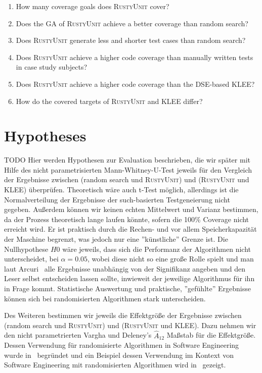 \documentclass[paper=a4,%
  twoside,%
  BCOR4mm,%
  abstract=true,%
  toc=bibliography,%
  chapterprefix=true,%
  toc=bibliographynumbered,%
  open=right,%
  english,%
  pagesize=pdftex]{scrreprt}
\begin{document}
\begin{enumerate}[start=1, label={\bfseries RQ\arabic*:}]
    \item How many coverage goals does \textsc{RustyUnit} cover?
    \item Does the \ac{GA} of \textsc{RustyUnit} achieve a better coverage than random search?
    \item Does \textsc{RustyUnit} generate less and shorter test cases than random search?
    \item Does \textsc{RustyUnit} achieve a higher code coverage than manually written tests in case study subjects?
    \item Does \textsc{RustyUnit} achieve a higher code coverage than the \ac{DSE}-based \textsc{KLEE}?
    \item How do the covered targets of \textsc{RustyUnit} and \textsc{KLEE} differ?
\end{enumerate} 


\section{Hypotheses}
\label{sec:hypotheses}
TODO Hier werden Hypothesen zur Evaluation beschrieben, die wir später mit Hilfe des nicht parametrisierten Mann-Whitney-U-Test jeweils für den Vergleich der Ergebnisse zwischen (random search und \textsc{RustyUnit}) und (\textsc{RustyUnit} und \textsc{KLEE}) überprüfen. Theoretisch wäre auch t-Test möglich, allerdings ist die Normalverteilung der Ergebnisse der such-basierten Testgeneierung nicht gegeben. Außerdem können wir keinen echten Mittelwert und Varianz bestimmen, da der Prozess theoretisch lange laufen könnte, sofern die 100\% Coverage nicht erreicht wird. Er ist praktisch durch die Rechen- und vor allem Speicherkapazität der Maschine begrenzt, was jedoch nur eine ''künstliche'' Grenze ist. Die Nullhypothese $H0$ wäre jeweils, dass sich die Performanz der Algorithmen nicht unterscheidet, bei $\alpha = 0.05$, wobei diese nicht so eine große Rolle spielt und man laut Arcuri~\cite{Arcuri2011} alle Ergebnisse unabhängig von der Signifikanz angeben und den Leser selbst entscheiden lassen sollte, inwieweit der jeweilige Algorithmus für ihn in Frage kommt. Statistische Auswertung und praktische, ''gefühlte'' Ergebnisse können sich bei randomisierten Algorithmen stark unterscheiden. 

Des Weiteren bestimmen wir jeweils die Effektgröße der Ergebnisse zwischen (random search und \textsc{RustyUnit}) und (\textsc{RustyUnit} und \textsc{KLEE}). Dazu nehmen wir den nicht parametrierten Vargha und Deleney's $\hat{A}_{12}$ Maßstab für die Effektgröße. Dessen Verwendung für randomisierte Algorithmen in Software Engineering wurde in~\cite{Leech2002} begründet und ein Beispiel dessen Verwendung im Kontext von Software Engineering mit randomisierten Algorithmen wird in~\cite{Poulding2010} gezeigt. 
\end{document}

